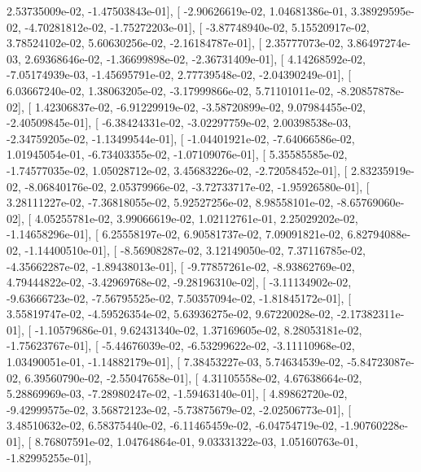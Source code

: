 \documentclass{article}
\begin{document}
          2.53735009e-02,  -1.47503843e-01],
       [ -2.90626619e-02,   1.04681386e-01,   3.38929595e-02,
         -4.70281812e-02,  -1.75272203e-01],
       [ -3.87748940e-02,   5.15520917e-02,   3.78524102e-02,
          5.60630256e-02,  -2.16184787e-01],
       [  2.35777073e-02,   3.86497274e-03,   2.69368646e-02,
         -1.36699898e-02,  -2.36731409e-01],
       [  4.14268592e-02,  -7.05174939e-03,  -1.45695791e-02,
          2.77739548e-02,  -2.04390249e-01],
       [  6.03667240e-02,   1.38063205e-02,  -3.17999866e-02,
          5.71101011e-02,  -8.20857878e-02],
       [  1.42306837e-02,  -6.91229919e-02,  -3.58720899e-02,
          9.07984455e-02,  -2.40509845e-01],
       [ -6.38424331e-02,  -3.02297759e-02,   2.00398538e-03,
         -2.34759205e-02,  -1.13499544e-01],
       [ -1.04401921e-02,  -7.64066586e-02,   1.01945054e-01,
         -6.73403355e-02,  -1.07109076e-01],
       [  5.35585585e-02,  -1.74577035e-02,   1.05028712e-02,
          3.45683226e-02,  -2.72058452e-01],
       [  2.83235919e-02,  -8.06840176e-02,   2.05379966e-02,
         -3.72733717e-02,  -1.95926580e-01],
       [  3.28111227e-02,  -7.36818055e-02,   5.92527256e-02,
          8.98558101e-02,  -8.65769060e-02],
       [  4.05255781e-02,   3.99066619e-02,   1.02112761e-01,
          2.25029202e-02,  -1.14658296e-01],
       [  6.25558197e-02,   6.90581737e-02,   7.09091821e-02,
          6.82794088e-02,  -1.14400510e-01],
       [ -8.56908287e-02,   3.12149050e-02,   7.37116785e-02,
         -4.35662287e-02,  -1.89438013e-01],
       [ -9.77857261e-02,  -8.93862769e-02,   4.79444822e-02,
         -3.42969768e-02,  -9.28196310e-02],
       [ -3.11134902e-02,  -9.63666723e-02,  -7.56795525e-02,
          7.50357094e-02,  -1.81845172e-01],
       [  3.55819747e-02,  -4.59526354e-02,   5.63936275e-02,
          9.67220028e-02,  -2.17382311e-01],
       [ -1.10579686e-01,   9.62431340e-02,   1.37169605e-02,
          8.28053181e-02,  -1.75623767e-01],
       [ -5.44676039e-02,  -6.53299622e-02,  -3.11110968e-02,
          1.03490051e-01,  -1.14882179e-01],
       [  7.38453227e-03,   5.74634539e-02,  -5.84723087e-02,
          6.39560790e-02,  -2.55047658e-01],
       [  4.31105558e-02,   4.67638664e-02,   5.28869969e-03,
         -7.28980247e-02,  -1.59463140e-01],
       [  4.89862720e-02,  -9.42999575e-02,   3.56872123e-02,
         -5.73875679e-02,  -2.02506773e-01],
       [  3.48510632e-02,   6.58375440e-02,  -6.11465459e-02,
         -6.04754719e-02,  -1.90760228e-01],
       [  8.76807591e-02,   1.04764864e-01,   9.03331322e-03,
          1.05160763e-01,  -1.82995255e-01],
\end{document}
